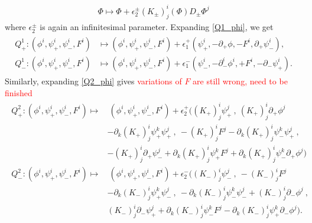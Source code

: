 \documentclass[letterpaper,12pt]{article}
\newcommand{\p}{\partial}
\newtheorem{lemma}[theorem]{Lemma}
\theoremstyle{definition}
\theoremstyle{remark}
\theoremstyle{examples}
\begin{document}
\begin{align}\label{Q2_phi}
 \Phi \mapsto \Phi + \epsilon^{\pm}_2 (K_\pm)^i_j(\Phi)D_\pm\Phi^j
\end{align}
where $\epsilon^\pm_2$ is again an infinitesimal parameter. Expanding \eqref{Q1_phi}, we get
\begin{align}\label{Q1_action}
\begin{aligned}
Q^1_{+} : (\phi^i, \psi^i_+, \psi^i_-, F^i) &\mapsto (\phi^i, \psi^i_+,\psi^i_-, F^i) + \epsilon^+_1 (\psi^i_+, -\partial_+ \phi, -F^i, \partial_+ \psi^i_-),\\
Q^1_{-} : (\phi^i, \psi^i_+, \psi^i_-, F^i)  &\mapsto (\phi^i, \psi^i_+,\psi^i_-, F^i) + \epsilon^-_1 (\psi^i_-, -\partial^i_- \phi^i, + F^i, - \partial_- \psi^i_+). 
\end{aligned}
\end{align}
Similarly, expanding \eqref{Q2_phi} gives \textcolor{red}{variations of $F$ are still wrong, need to be finished}
\begin{align}\label{Q2_action}
\begin{aligned}
Q^2_{+} : (\phi^i, \psi^i_+, \psi^i_-, F^i) \mapsto &\  (\phi^i, \psi^i_+, \psi^i_-, F^i)
+\epsilon_2^+\Big((K_+)^i_j \psi_+ ^j\ ,\  (K_+)^{i}_{j} \partial_+ \phi^j\\
& -\partial_k(K_+)^i_j \psi_+^k \psi_+^j\ ,\ -(K_+)^i_j F^j{-}\p_k(K_+)^i_j\psi^k_-\psi^j_+\ ,\ \\
&-(K_+)^i_j\p_+\psi_-^j+\p_k(K_+)^i_j\psi^k_+F^j+\p_k(K_+)^i_j\psi^k_-\p_+\phi^j\Big)\\
Q^2_{-} : (\phi^i, \psi^i_+, \psi^i_-, F^i) \mapsto &\ (\phi^i, \psi^i_+, \psi^i_-, F^i)
+\epsilon_2^-\Big((K_-)^i_j \psi_- ^j\ ,\ - (K_-)^i_j F^j  \\
&-\partial_k(K_-)^i_j \psi_+^k \psi_-^j\ ,\ -\p_k(K_-)^i_j\psi^k_-\psi^j_-+(K_-)^{i}_{j} \partial_- \phi^j\ ,\  \\
&(K_-)^i_j\p_-\psi_+^j+\p_k(K_-)^i_j\psi^k_-F^j-\p_k(K_-)^i_j\psi^k_+\p_-\phi^j\Big).
\end{aligned}
\end{align}
%
\end{document}
